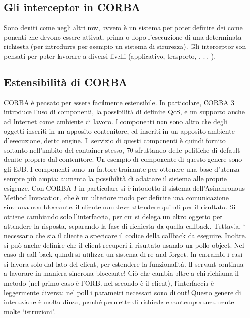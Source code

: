 \subsection{Gli interceptor in CORBA}
Sono deniti come negli altri mw, ovvero è un sistema per poter definire dei come
ponenti che devono essere attivati prima o dopo l'esecuzione di una determinata
richiesta (per introdurre per esempio un sistema di sicurezza). Gli interceptor
son pensati per poter lavorare a diversi livelli (applicativo, trasporto, . . . ).
\subsection{Estensibilità di CORBA}
CORBA è pensato per essere facilmente estensibile. In particolare, CORBA
3 introduce l'uso di componenti, la possibilità di definire QoS, e un supporto
anche ad Internet come ambiente di lavoro.
I componenti non sono altro che degli oggetti inseriti in un apposito contenitore, ed inseriti in un apposito ambiente
d'esecuzione, detto engine. Il servizio
di questi componenti è quindi fornito soltanto nell'ambito del container stesso,
70
sfruttando delle politiche di default denite proprio dal contenitore. Un esempio
di componente di questo genere sono gli EJB.
I componenti sono un fattore trainante per ottenere una base d'utenza sempre più ampia: aumenta la possibilità di
adattare il sistema alle proprie esigenze.
Con CORBA 3 in particolare si è intodotto il sistema dell'Asinchronous
Method Invocation, che è un ulteriore modo per definire una comunicazione
sincrona non bloccante: il cliente non deve attendere quindi per il risultato.
Si ottiene cambiando solo l'interfaccia, per cui si delega un altro oggetto per
attendere la risposta, separando la fase di richiesta da quella callback. Tuttavia,
` necessario che sia il cliente a specicare il codice della callback da eseguire.
Inoltre, si può anche definire che il client recuperi il risultato usando un pollo
object. Nel caso di call-back quindi si utilizza un sistema di re and forget. In
entrambi i casi si lavora solo dal lato del client, per estendere la funzionalità.
Il servant continua a lavorare in maniera sincrona bloccante! Ciò che cambia
oltre a chi richiama il metodo (nel primo caso è l'ORB, nel secondo è il client),
l'interfaccia è leggermente diversa: nel poll i parametri necessari sono di out!
Questo genere di interazione è molto diusa, perché permette di richiedere
contemporaneamente molte {`}istruzioni'.
